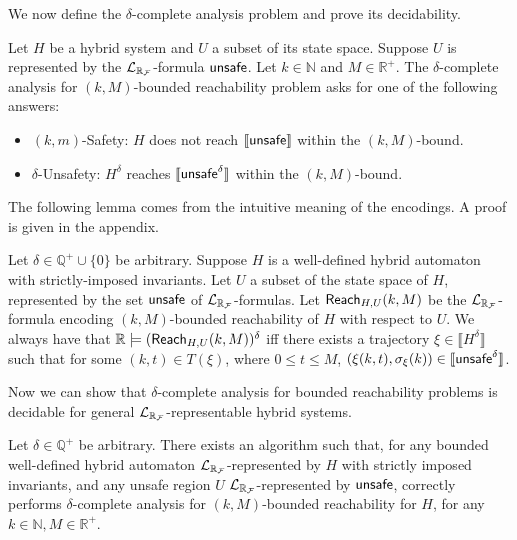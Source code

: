 \documentclass[12pt]{llncs}
\begin{document}
We now define the $\delta$-complete analysis problem and prove its decidability.
\begin{definition}
Let $H$ be a hybrid system and $U$ a subset of its state space. Suppose $U$ is represented by the $\mathcal{L}_{\mathbb{R}_{\mathcal{F}}}$-formula $\mathsf{unsafe}$. Let $k\in \mathbb{N}$ and $M\in \mathbb{R}^+$. The $\delta$-complete analysis for $(k,M)$-bounded reachability problem asks for one of the following answers:
\begin{itemize}
\item {\sf $(k,m)$-Safety:} $H$ does not reach $\llbracket\mathsf{unsafe}\rrbracket$ within the $(k,M)$-bound.
\item {\sf $\delta$-Unsafety:} $H^{\delta}$ reaches $\llbracket\mathsf{unsafe}^{\delta}\rrbracket$ within the $(k,M)$-bound.
\end{itemize}
\end{definition}
The following lemma comes from the intuitive meaning of the encodings. A proof is given in the appendix.
\begin{lemma}\label{equiv-delta}
Let $\delta\in\mathbb{Q}^+\cup \{0\}$ be arbitrary. Suppose $H$ is a well-defined hybrid automaton with strictly-imposed invariants. Let $U$ a subset of the state space of $H$, represented by the set  $\mathsf{unsafe}$ of $\mathcal{L}_{\mathbb{R}_{\mathcal{F}}}$-formulas. Let $\mathsf{Reach}_{H,U}(k,M)$ be the $\mathcal{L}_{\mathbb{R}_{\mathcal{F}}}$-formula encoding $(k,M)$-bounded reachability of $H$ with respect to $U$.  We always have that $\mathbb{R}\models(\mathsf{Reach}_{H,U}(k,M))^{\delta}$ iff there exists a trajectory $\xi\in\llbracket H^{\delta}\rrbracket$ such that for some $(k,t)\in T(\xi)$, where $0\leq t\leq M$, $(\xi(k, t), \sigma_{\xi}(k))\in \llbracket \mathsf{unsafe}^{\delta}\rrbracket$.
\end{lemma}
Now we can show that $\delta$-complete analysis for bounded reachability problems is decidable for general $\mathcal{L}_{\mathbb{R}_{\mathcal{F}}}$-representable hybrid systems.
\begin{theorem}[Decidability]
Let $\delta\in \mathbb{Q}^+$ be arbitrary. There exists an algorithm such that, for any bounded well-defined hybrid automaton $\mathcal{L}_{\mathbb{R}_{\mathcal{F}}}$-represented by $H$ with strictly imposed invariants, and any unsafe region $U$ $\mathcal{L}_{\mathbb{R}_{\mathcal{F}}}$-represented by $\mathsf{unsafe}$, correctly performs $\delta$-complete analysis for $(k,M)$-bounded reachability for $H$, for any $k\in \mathbb{N}, M\in \mathbb{R}^+$.
\end{theorem}
\end{document}
